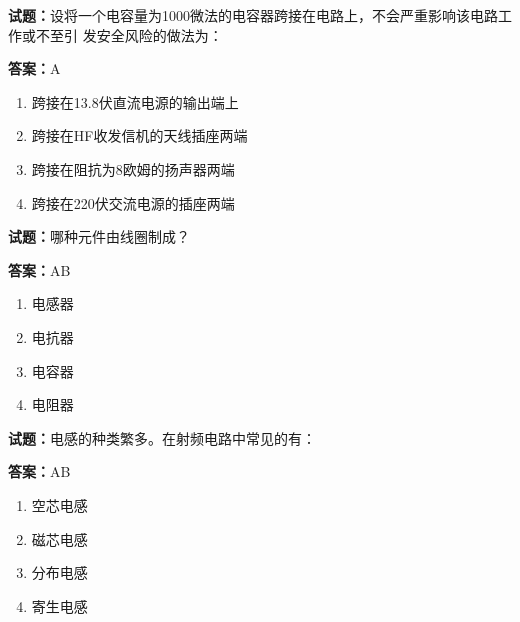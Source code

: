 \documentclass{ctexbook}
\begin{document}




\vspace{1em}

\textbf{试题：}设将一个电容量为1000微法的电容器跨接在电路上，不会严重影响该电路工作或不至引
发安全风险的做法为： 

\textbf{答案：}A 

\begin{enumerate}[leftmargin=3em]
  \item 跨接在13.8伏直流电源的输出端上 

  \item 跨接在HF收发信机的天线插座两端 

  \item 跨接在阻抗为8欧姆的扬声器两端 

  \item 跨接在220伏交流电源的插座两端 

\end{enumerate}





\vspace{1em}

\textbf{试题：}哪种元件由线圈制成？ 

\textbf{答案：}AB 

\begin{enumerate}[leftmargin=3em]
  \item 电感器 

  \item 电抗器 

  \item 电容器 

  \item 电阻器 

\end{enumerate}





\vspace{1em}

\textbf{试题：}电感的种类繁多。在射频电路中常见的有： 

\textbf{答案：}AB 

\begin{enumerate}[leftmargin=3em]
  \item 空芯电感 

  \item 磁芯电感 

  \item 分布电感 

  \item 寄生电感 

\end{enumerate}
\end{document}
